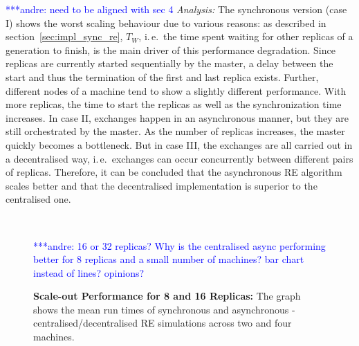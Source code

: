 \documentclass{rspublic}
\newcommand{\alnote}[1]{ {\textcolor{blue} { ***andre: #1 }}}
\newcommand{\alnote}[1]{}
\begin{document}
\alnote{need to be aligned with sec 4}
{\it Analysis: } The synchronous version (case I) shows the
worst scaling behaviour due to various reasons: as described in section~\ref{sec:impl_sync_re},
$T_{W}$, i.\,e.\ the time spent waiting for other replicas of a generation to finish,
is the main driver of this performance degradation. Since replicas are currently started
sequentially by the master, a delay between the start and thus the termination of the first and 
last replica exists. Further, different nodes of a machine tend to show a slightly 
different performance. With more replicas, the time to start the replicas as well as the
synchronization time increases.  In case II, exchanges happen in
an asynchronous manner, but they are still orchestrated by the master. 
As the number of replicas increases, the master quickly becomes
a bottleneck. But in case III, the exchanges are all carried out in a
decentralised way, i.\,e.\ exchanges can occur concurrently between 
different pairs of replicas. Therefore, it can be concluded that the asynchronous
RE algorithm scales better and that the decentralised implementation
is superior to the centralised one.

%
\begin{figure}%
\centering
{}\qquad
{}\\
\caption{\textbf{Scale-out Performance for 8 and 16 Replicas:} 
  The graph shows the mean run times of synchronous and
  asynchronous - centralised/decentralised RE simulations across two
  and four machines.}
  \alnote{16 or 32 replicas? Why is the centralised async performing better for 8 replicas and a small number of machines? bar chart instead of lines? opinions?}
\label{fig:24machines}
\end{figure}
\end{document}
